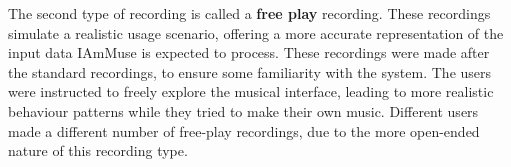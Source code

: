 The second type of recording is called a \textbf{free play} recording.
These recordings simulate a realistic usage scenario, offering a more accurate representation of the input data IAmMuse is expected to process.
These recordings were made after the standard recordings, to ensure some familiarity with the system.
The users were instructed to freely explore the musical interface, leading to more realistic behaviour patterns while they tried to make their own music.
Different users made a different number of free-play recordings, due to the more open-ended nature of this recording type.









